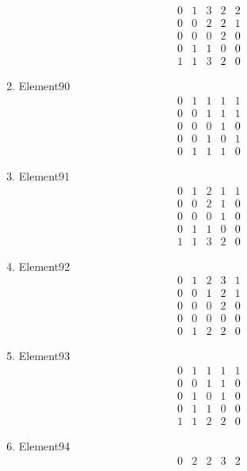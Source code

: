 \documentclass[12pt]{article}
\begin{document}
\begin{multicols}{3}
\begin{enumerate}
\begin{equation*}
\begin{array}{ccccc}
0&1&3&2&2\\
0&0&2&2&1\\
0&0&0&2&0\\
0&1&1&0&0\\
1&1&3&2&0
\end{array}
\end{equation*}
\item Element90
\begin{equation*}
\begin{array}{ccccc}
0&1&1&1&1\\
0&0&1&1&1\\
0&0&0&1&0\\
0&0&1&0&1\\
0&1&1&1&0
\end{array}
\end{equation*}
\item Element91
\begin{equation*}
\begin{array}{ccccc}
0&1&2&1&1\\
0&0&2&1&0\\
0&0&0&1&0\\
0&1&1&0&0\\
1&1&3&2&0
\end{array}
\end{equation*}
\item Element92
\begin{equation*}
\begin{array}{ccccc}
0&1&2&3&1\\
0&0&1&2&1\\
0&0&0&2&0\\
0&0&0&0&0\\
0&1&2&2&0
\end{array}
\end{equation*}
\item Element93
\begin{equation*}
\begin{array}{ccccc}
0&1&1&1&1\\
0&0&1&1&0\\
0&1&0&1&0\\
0&1&1&0&0\\
1&1&2&2&0
\end{array}
\end{equation*}
\item Element94
\begin{equation*}
\begin{array}{ccccc}
0&2&2&3&2\\

\end{array}
\end{equation*}
\end{enumerate}
\end{multicols}
\end{document}
